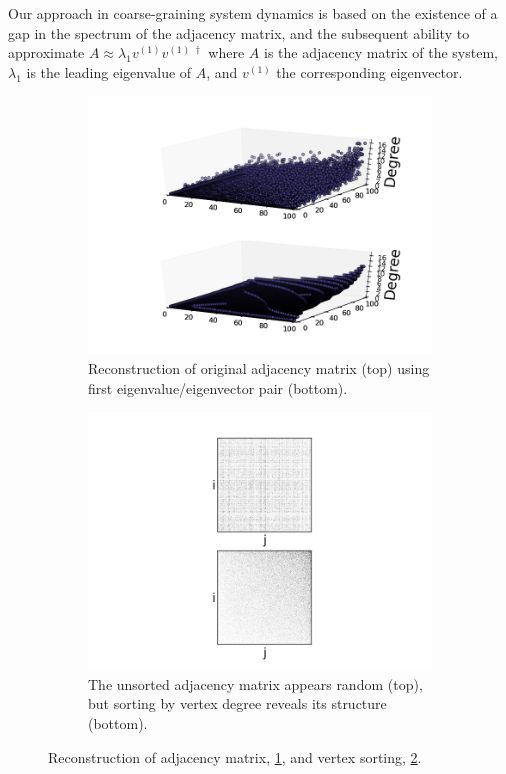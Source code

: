 \documentclass[11pt]{article}
\begin{document}
\indent Our approach in coarse-graining system dynamics is based on the existence of a gap in the spectrum of the adjacency matrix, and the subsequent ability to approximate $A\approx \lambda_{1}v^{(1)}v^{(1) \;\dagger}$ where $A$ is the adjacency matrix of the system, $\lambda_{1}$ is the leading eigenvalue of $A$, and $v^{(1)}$ the corresponding eigenvector.
\begin{figure}[h!]
  \centering
  \begin{subfigure}{.5\textwidth}
    \centering
    \includegraphics[width=0.7\linewidth]{paRecon}
    \captionsetup{width=0.8\textwidth}
    \caption{Reconstruction of original adjacency matrix (top) using first eigenvalue/eigenvector pair (bottom).}
    \label{fig:paRecon}
  \end{subfigure}%
  \begin{subfigure}{.5\textwidth}
    \centering
    \includegraphics[width=0.7\linewidth]{paAdjSort}
    \captionsetup{width=0.8\textwidth}
    \caption{The unsorted adjacency matrix appears random (top), but sorting by vertex degree reveals its structure (bottom).}
    \label{fig:paAdjSort}
  \end{subfigure}%
  \caption{Reconstruction of adjacency matrix, \ref{fig:paRecon}, and vertex sorting, \ref{fig:paAdjSort}.}
  \label{fig:paAdj}
\end{figure}
\end{document}
